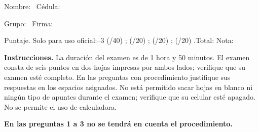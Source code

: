 \documentclass[11pt]{article}
\begin{document}
\examheader

\vspace{4pt}
\noindent Nombre: \dotfill\ Cédula: \dotfill

\vspace{4pt}
\noindent Grupo: \dotfill\ Firma: \dotfill

\vspace{4pt}
\noindent Puntaje. Solo para uso oficial:--3 (/40) \dotfill; (/20) \dotfill; (/20) \dotfill; (/20) \dotfill.\quad Total: \dotfill\quad Nota: \dotfill

\vspace{6pt}
\noindent\textbf{Instrucciones.} La duración del examen es de 1 hora y 50 minutos. El examen consta de seis puntos en dos hojas impresas por ambos lados; verifique que su examen esté completo. En las preguntas con procedimiento justifique sus respuestas en los espacios asignados. No está permitido sacar hojas en blanco ni ningún tipo de apuntes durante el examen; verifique que su celular esté apagado. No se permite el uso de calculadora.

\vspace{8pt}
\noindent\textbf{En las preguntas 1 a 3 no se tendrá en cuenta el procedimiento.}
\end{document}
